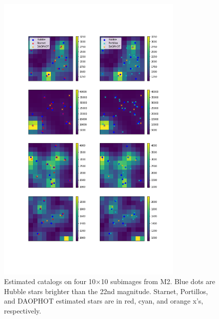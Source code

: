 \begin{figure}[h]
    \centering
    \vspace{-3cm}
    \includegraphics[width=0.8\textwidth]{figures/example_subimages.png}    
    \vspace{-3cm}
    \caption{Estimated catalogs on four 10$\times$10 subimages from 
    M2. Blue dots are Hubble stars brighter than the 22nd magnitude. 
    Starnet, Portillos, and DAOPHOT estimated stars are in 
    red, cyan, and orange x's, respectively. }
    \label{fig:example_subimages}
\end{figure}

